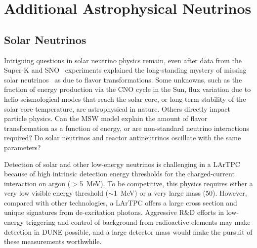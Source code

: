 




\section{Additional Astrophysical Neutrinos}
\label{sec:physics-snblowe-other}

\subsection{Solar Neutrinos}

Intriguing questions in solar neutrino physics remain,
even after data
from the Super-K and SNO~\cite{Fukuda:2001nj,Ahmad:2001an}
experiments explained the long-standing mystery of missing solar
neutrinos~\cite{Cleveland:1998nv} as due to flavor
transformations. 
Some unknowns, such as the fraction of energy production via the CNO
cycle in the Sun, flux variation due to helio-seismological modes that
reach the solar core, or long-term stability of the solar core
temperature, are astrophysical in nature. Others directly impact
particle physics. Can the MSW model explain the amount of flavor
transformation as a function of energy, or are non-standard neutrino
interactions required?  Do solar neutrinos and reactor antineutrinos
oscillate with the same parameters? 

Detection of solar and other low-energy neutrinos is challenging in
a LArTPC because of high intrinsic detection energy thresholds for
the charged-current interaction on argon ($>$\SI{5}{\MeV}). To be
competitive, this physics requires either a very low visible energy
threshold ($\sim$\SI{1}{\MeV}) or a very large mass (\SI{50}{\kt}).
However, compared with other technologies, a LArTPC offers a large
cross section and unique signatures from de-excitation
photons. Aggressive R\&D efforts in low-energy triggering and
control of background from radioactive elements may make detection
in DUNE possible, and a large detector mass would make the pursuit
of these measurements worthwhile.

